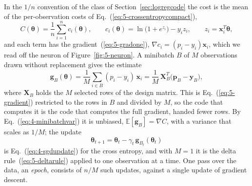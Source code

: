 In the $1/n$ convention of the class of Section~\ref{sec:logregcode} the
cost is the mean of the per-observation costs of
Eq.~(\ref{eq:5-crossentropycompact}),
\begin{equation}
  C(\bm{\theta}) = \frac1n\sum_{i=1}^{n}c_i(\bm{\theta}),
  \qquad
  c_i(\bm{\theta}) = \ln\bigl(1+e^{z_i}\bigr)-y_iz_i,
  \qquad z_i=\bm{x}_i^{T}\bm{\theta},
  \label{eq:5-costmean}
\end{equation}
and each term has the gradient~(\ref{eq:5-gradone}),
$\nabla c_i=(p_i-y_i)\bm{x}_i$, which we read off the neuron of
Figure~\ref{fig:5-neuron}.  A minibatch $B$ of $M$ observations drawn
without replacement gives the estimate
\begin{equation}
  \bm{g}_B(\bm{\theta})
   = \frac1M\sum_{i\in B}(p_i-y_i)\,\bm{x}_i
   = \frac1M\,\bm{X}_B^{T}\bigl(\bm{p}_B-\bm{y}_B\bigr),
  \label{eq:5-minibatchgrad}
\end{equation}
where $\bm{X}_B$ holds the $M$ selected rows of the design matrix.  This is
Eq.~(\ref{eq:5-gradient}) restricted to the rows in $B$ and divided by $M$,
so the code that computes it is the code that computes the full gradient,
handed fewer rows.  By Eq.~(\ref{eq:4-minibatchvar}) it is unbiased,
$\mathbb{E}[\bm{g}_B]=\nabla C$, with a variance that scales as $1/M$; the
update
\begin{equation}
  \bm{\theta}_{t+1} = \bm{\theta}_t - \gamma_t\,\bm{g}_{B_t}(\bm{\theta}_t)
  \label{eq:5-sgdupdate}
\end{equation}
is Eq.~(\ref{eq:4-sgdupdate}) for the cross entropy, and with $M=1$ it is
the delta rule~(\ref{eq:5-deltarule}) applied to one observation at a
time.  One pass over the data, an \emph{epoch}, consists of $n/M$ such
updates, against a single update of gradient descent.

